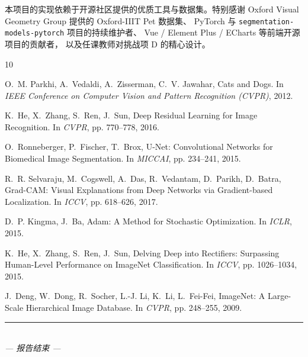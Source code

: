 \documentclass[12pt, a4paper, openany]{ctexbook}
\begin{document}
本项目的实现依赖于开源社区提供的优质工具与数据集。特别感谢
Oxford Visual Geometry Group 提供的 Oxford-IIIT Pet 数据集、
PyTorch 与 \texttt{segmentation-models-pytorch} 项目的持续维护者、
Vue / Element Plus / ECharts 等前端开源项目的贡献者，
以及任课教师对挑战项 D 的精心设计。

\begin{thebibliography}{10}

O.~M. Parkhi, A.~Vedaldi, A.~Zisserman, C.~V. Jawahar,
\newblock Cats and Dogs.
\newblock In \emph{IEEE Conference on Computer Vision and Pattern Recognition
  (CVPR)}, 2012.

K.~He, X.~Zhang, S.~Ren, J.~Sun,
\newblock Deep Residual Learning for Image Recognition.
\newblock In \emph{CVPR}, pp. 770--778, 2016.

O.~Ronneberger, P.~Fischer, T.~Brox,
\newblock U-Net: Convolutional Networks for Biomedical Image Segmentation.
\newblock In \emph{MICCAI}, pp. 234--241, 2015.

R.~R. Selvaraju, M.~Cogswell, A.~Das, R.~Vedantam, D.~Parikh, D.~Batra,
\newblock Grad-CAM: Visual Explanations from Deep Networks via Gradient-based
  Localization.
\newblock In \emph{ICCV}, pp. 618--626, 2017.

D.~P. Kingma, J.~Ba,
\newblock Adam: A Method for Stochastic Optimization.
\newblock In \emph{ICLR}, 2015.

K.~He, X.~Zhang, S.~Ren, J.~Sun,
\newblock Delving Deep into Rectifiers: Surpassing Human-Level Performance on
  ImageNet Classification.
\newblock In \emph{ICCV}, pp. 1026--1034, 2015.

J.~Deng, W.~Dong, R.~Socher, L.-J. Li, K.~Li, L.~Fei-Fei,
\newblock ImageNet: A Large-Scale Hierarchical Image Database.
\newblock In \emph{CVPR}, pp. 248--255, 2009.

\end{thebibliography}

\vspace{2cm}
\begin{center}
\rule{0.5\linewidth}{0.4pt}\\[0.5cm]
{\itshape — 报告结束 —}
\end{center}
\end{document}
